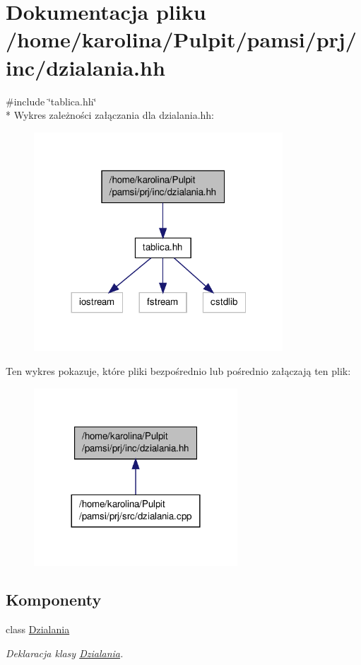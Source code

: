 \hypertarget{dzialania_8hh}{\section{Dokumentacja pliku /home/karolina/\-Pulpit/pamsi/prj/inc/dzialania.hh}
\label{dzialania_8hh}
}
{\ttfamily \#include \char`\"{}tablica.\-hh\char`\"{}}\\*
Wykres zależności załączania dla dzialania.\-hh\-:\nopagebreak
\begin{figure}[H]
\begin{center}
\leavevmode
\includegraphics[width=264pt]{dzialania_8hh__incl}
\end{center}
\end{figure}
Ten wykres pokazuje, które pliki bezpośrednio lub pośrednio załączają ten plik\-:\nopagebreak
\begin{figure}[H]
\begin{center}
\leavevmode
\includegraphics[width=216pt]{dzialania_8hh__dep__incl}
\end{center}
\end{figure}
\subsection*{Komponenty}
\begin{DoxyCompactItemize}
\item 
class \hyperlink{class_dzialania}{Dzialania}
\begin{DoxyCompactList}\small\item\em Deklaracja klasy \hyperlink{class_dzialania}{Dzialania}. \end{DoxyCompactList}\end{DoxyCompactItemize}
